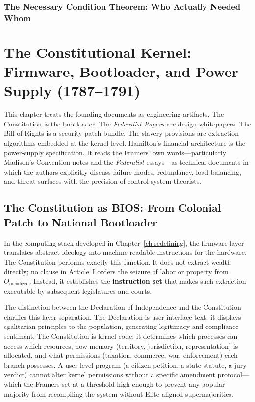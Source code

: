 \subsection{The Necessary Condition Theorem: Who Actually Needed Whom}
\label{sec:necessary_condition}

\chapter{The Constitutional Kernel: Firmware, Bootloader, and Power Supply (1787--1791)}
\label{ch:constitutional}

This chapter treats the founding documents as engineering artifacts. The Constitution is the bootloader. The \textit{Federalist Papers} are design whitepapers. The Bill of Rights is a security patch bundle. The slavery provisions are extraction algorithms embedded at the kernel level. Hamilton's financial architecture is the power-supply specification. It reads the Framers' own words---particularly Madison's Convention notes and the \textit{Federalist} essays---as technical documents in which the authors explicitly discuss failure modes, redundancy, load balancing, and threat surfaces with the precision of control-system theorists.

\section{The Constitution as BIOS: From Colonial Patch to National Bootloader}

In the computing stack developed in Chapter~\ref{ch:redefining}, the firmware layer translates abstract ideology into machine-readable instructions for the hardware. The Constitution performs exactly this function. It does not extract wealth directly; no clause in Article~I orders the seizure of labor or property from $O_{\text{racialized}}$. Instead, it establishes the \textbf{instruction set} that makes such extraction executable by subsequent legislatures and courts.

The distinction between the Declaration of Independence and the Constitution clarifies this layer separation. The Declaration is user-interface text: it displays egalitarian principles to the population, generating legitimacy and compliance sentiment. The Constitution is kernel code: it determines which processes can access which resources, how memory (territory, jurisdiction, representation) is allocated, and what permissions (taxation, commerce, war, enforcement) each branch possesses. A user-level program (a citizen petition, a state statute, a jury verdict) cannot alter kernel permissions without a specific amendment protocol---which the Framers set at a threshold high enough to prevent any popular majority from recompiling the system without Elite-aligned supermajorities.

